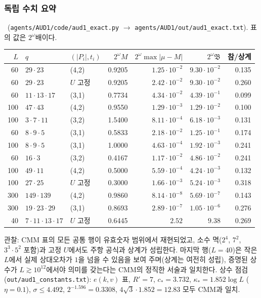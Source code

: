 \subsubsection{독립 수치 요약}\label{AUD1:ssec-num}
\NUMERIC\ (\texttt{agents/AUD1/code/aud1\_exact.py} $\to$ \texttt{agents/AUD1/out/aud1\_exact.txt}). 표의 값은 $2^\omega$배이다.
\begin{center}\small
\begin{tabular}{rllrrrr}
\toprule
$L$ & $q$ & $(|P_i|,t_i)$ & $2^\omega M$ & $2^\omega\max|\mu-M|$ & $2^\omega\mathfrak B$ & 참/상계\\
\midrule
60 & $29\cdot23$ & (4,2) & 0.9205 & $1.25\cdot10^{-2}$ & $9.30\cdot10^{-2}$ & 0.135\\
60 & $29\cdot23$ & $U$ 고정 & 0.9205 & $2.42\cdot10^{-2}$ & $9.30\cdot10^{-2}$ & 0.260\\
60 & $11\cdot13\cdot17$ & (3,1) & 0.7734 & $4.34\cdot10^{-2}$ & $4.39\cdot10^{-1}$ & 0.099\\
100 & $47\cdot43$ & (4,2) & 0.9550 & $1.29\cdot10^{-3}$ & $1.29\cdot10^{-2}$ & 0.100\\
100 & $3\cdot7\cdot11$ & (3,2) & 1.5400 & $8.11\cdot10^{-4}$ & $6.18\cdot10^{-3}$ & 0.131\\
60 & $8\cdot9\cdot5$ & (3,1) & 0.5833 & $2.18\cdot10^{-2}$ & $1.25\cdot10^{-1}$ & 0.174\\
100 & $8\cdot9\cdot5$ & (3,1) & 1.0000 & $4.63\cdot10^{-4}$ & $1.92\cdot10^{-3}$ & 0.241\\
60 & $16\cdot3$ & (3,2) & 0.4167 & $1.17\cdot10^{-2}$ & $4.86\cdot10^{-2}$ & 0.241\\
100 & $49\cdot11$ & (4,2) & 0.5000 & $5.59\cdot10^{-4}$ & $4.24\cdot10^{-3}$ & 0.132\\
100 & $27\cdot25$ & $U$ 고정 & 0.3000 & $1.66\cdot10^{-3}$ & $5.24\cdot10^{-3}$ & 0.318\\
300 & $149\cdot139$ & (4,2) & 0.9860 & $8.14\cdot10^{-8}$ & $5.69\cdot10^{-7}$ & 0.143\\
300 & $19\cdot23\cdot29$ & (3,1) & 0.8693 & $2.89\cdot10^{-7}$ & $1.05\cdot10^{-6}$ & 0.276\\
40 & $7\cdot11\cdot13\cdot17$ & $U$ 고정 & 0.6445 & $2.52$ & $9.38$ & 0.269\\
\bottomrule
\end{tabular}
\end{center}
관찰: CMM 표의 모든 공통 행이 유효숫자 범위에서 재현되었고, 소수 멱($2^4$, $7^2$, $3^3\cdot5^2$ 포함)과 고정 $U$에서도 주항 공식과 상계가 성립한다.
마지막 행($L=40$)은 작은 $L$에서 실제 상대오차가 $1$을 넘을 수 있음을 보여 주며(상계는 여전히 성립), 증명된 상수가 $L\gtrsim10^{12}$에서야 의미를 갖는다는 CMM의 정직한 서술과 일치한다.
상수 점검(\texttt{out/aud1\_constants.txt}): $e(k,v)$ 표, $R'=7$, $c_*=3.732$, $\kappa_*=1.852\log L$ ($\eta=0.1$), $\sigma\le4.492$, $2^{-1.596}=0.3308$, $4\sqrt3\cdot1.852=12.83$ 모두 CMM과 일치.
